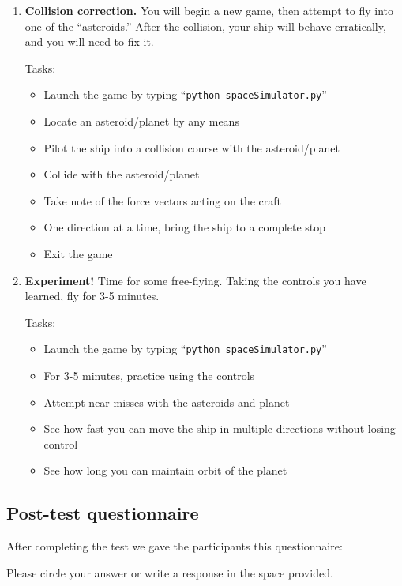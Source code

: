 \begin{enumerate}
  \item \textbf{Collision correction.}  You will begin a new game, then attempt to fly into one of the ``asteroids.''  After the collision, your ship will behave erratically, and you will need to fix it.
  
  Tasks:
  \begin{itemize}
    \item Launch the game by typing ``\texttt{python spaceSimulator.py}''
    \item Locate an asteroid/planet by any means
    \item Pilot the ship into a collision course with the asteroid/planet
    \item Collide with the asteroid/planet
    \item Take note of the force vectors acting on the craft
    \item One direction at a time, bring the ship to a complete stop
    \item Exit the game
  \end{itemize}
  
  \item \textbf{Experiment!}  Time for some free-flying.  Taking the controls you have learned, fly for 3-5 minutes. 
  
  Tasks:
  \begin{itemize}
    \item Launch the game by typing ``\texttt{python spaceSimulator.py}''
    \item For 3-5 minutes, practice using the controls
    \item Attempt near-misses with the asteroids and planet
    \item See how fast you can move the ship in multiple directions without losing control
    \item See how long you can maintain orbit of the planet
  \end{itemize}

\end{enumerate}

\subsection{Post-test questionnaire}

After completing the test we gave the participants this questionnaire:

\vspace{10mm}
\noindent Please circle your answer or write a response in the space provided.

